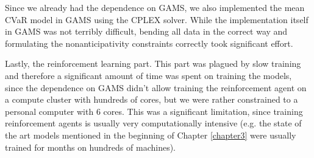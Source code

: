 Since we already had the dependence on GAMS, we also implemented the mean CVaR model in GAMS using the CPLEX solver. While the implementation itself in GAMS was not terribly difficult, bending all data in the correct way and formulating the nonanticipativity constraints correctly took significant effort.

Lastly, the reinforcement learning part. This part was plagued by slow training and therefore a significant amount of time was spent on training the models, since the dependence on GAMS didn't allow training the reinforcement agent on a compute cluster with hundreds of cores, but we were rather constrained to a personal computer with 6 cores. This was a significant limitation, since training reinforcement agents is usually very computationally intensive (e.g. the state of the art models mentioned in the beginning of Chapter \ref{chapter3} were usually trained for months on hundreds of machines).